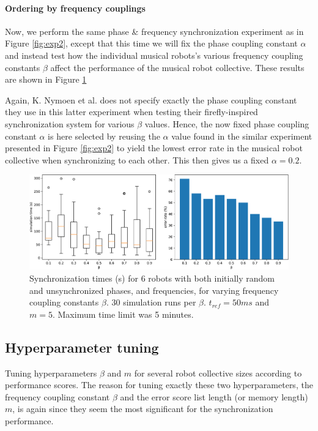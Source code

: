 		
		\paragraph{Ordering by frequency couplings}
		
		Now, we perform the same phase \& frequency synchronization experiment as in Figure \ref{fig:exp2}, except that this time we will fix the phase coupling constant $\alpha$ and instead test how the individual musical robots's various frequency coupling constants $\beta$ affect the performance of the musical robot collective. These results are shown in Figure \ref{fig:exp3}
		
		Again, K. Nymoen et al. does not specify exactly the phase coupling constant they use in this latter experiment when testing their firefly-inspired synchronization system for various $\beta$ values. Hence, the now fixed phase coupling constant $\alpha$ is here selected by reusing the $\alpha$ value found in the similar experiment presented in Figure \ref{fig:exp2} to yield the lowest error rate in the musical robot collective when synchronizing to each other. This then gives us a fixed $\alpha = 0.2$.
		
		\begin{figure}[ht!]
			\centering
			\includegraphics[width=\linewidth]{Assets/DocSegments/Chapters/ExperimentsAndResults/Figures/PerfScores/experiment3_perfScores.pdf}
			\caption{Synchronization times (s) for 6 robots with both initially random and unsynchronized phases, and frequencies, for varying frequency coupling constants $\beta$. 30 simulation runs per $\beta$. $t_{ref}=50ms$ and $m=5$. Maximum time limit was 5 minutes.}
			\label{fig:exp3}
		\end{figure}
		
		
	\subsection{Hyperparameter tuning}
	Tuning hyperparameters $\beta$ and $m$ for several robot collective sizes according to performance scores. The reason for tuning exactly these two hyperparameters, the frequency coupling constant $\beta$ and the error score list length (or memory length) $m$, is again since they seem the most significant for the synchronization performance.